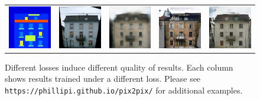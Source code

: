 \begin{figure}[t]
\begin{center}
\begin{tabular}{ccccc}
\includegraphics[width=0.2\linewidth]{figs/facades2_loss_variations_latex/input_60.jpg} &
\includegraphics[width=0.2\linewidth]{figs/facades2_loss_variations_latex/gt_60.jpg} &
\includegraphics[width=0.2\linewidth]{figs/facades2_loss_variations_latex/L1_60.jpg} &
\includegraphics[width=0.2\linewidth]{figs/facades2_loss_variations_latex/cGAN_60.jpg} &
\includegraphics[width=0.2\linewidth]{figs/facades2_loss_variations_latex/L1cGAN_60.jpg}

\end{tabular} \egroup 
\end{center}
\vspace{-0.2in}
\caption{Different losses induce different quality of results. Each column shows results trained under a different loss. Please see \texttt{https://phillipi.github.io/pix2pix/} for additional examples.}
\label{cityscapes_loss_variations_qualitative}
\vspace{-0.2in}
\end{figure}